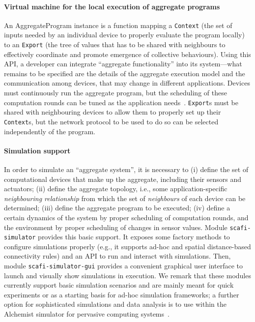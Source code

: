\paragraph*{Virtual machine for the local execution of aggregate programs}
%
An AggregateProgram instance 
 is a function
 mapping a \texttt{Context}
 (the set of inputs needed by an individual device
  to properly evaluate the program locally)
 to an \texttt{Export}
 (the tree of values that has to be shared 
  with neighbours to effectively coordinate and promote 
  emergence of collective behaviours).
%
Using this API,
 a developer can 
 integrate ``aggregate functionality''
 into its system---what remains to be specified are the
 details of the aggregate execution model and the communication among devices,
 that may change in different applications.
%
Devices must continuously run the aggregate program,
but the scheduling of these computation rounds can be tuned
as the application needs~\cite{DBLP:journals/lmcs/PianiniCVMZ21}.
%
\texttt{Export}s must be shared with neighbouring devices to allow them
to properly set up their \texttt{Context}s,
but the network protocol to be used to do so can be selected
independently of the program.
 
\paragraph*{Simulation support}
%
In order to simulate an ``aggregate system'',
 it is necessary 
 to 
 (i) define the set of computational devices that make up the aggregate, including their sensors and actuators;
 (ii) define the aggregate topology, i.e., 
  some application-specific \emph{neighbouring relationship}
  from which the set of \emph{neighbours}
  of each device can be determined;
 (iii) define the aggregate program to be executed;
 (iv) define a certain dynamics of the system
  by proper scheduling of computation rounds,
  and the environment
  by proper scheduling of changes in sensor values.
%
Module \texttt{scafi-simulator}
 provides this basic support.
%
It exposes some factory methods
to configure simulations properly
 (e.g., it supports ad-hoc and spatial distance-based connectivity rules)
 and an API to run and interact with simulations.
%
Then, module \texttt{scafi-simulator-gui}
 provides a convenient graphical user interface
 to launch and visually show simulations in execution.
%
We remark that these modules
 currently support basic simulation scenarios
 and are mainly meant for quick experiments
 or as a starting basis for ad-hoc simulation frameworks;
 a further option for sophisticated simulations and data analysis is to use \scafi{} within the Alchemist simulator for pervasive computing systems~\cite{alchemist,scafi-alchemist}.
 
